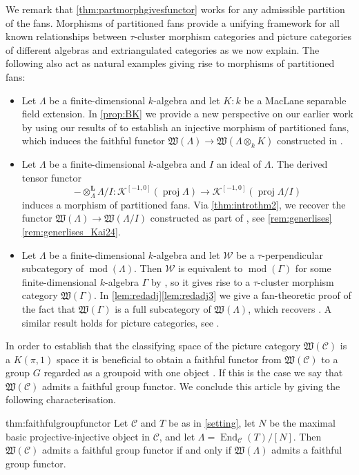 \documentclass[10pt,twoside, a4paper,reqno]{amsart}
\DeclareMathOperator{\mods}{mod}
\DeclareMathOperator{\End}{End}
\DeclareMathOperator{\proj}{proj}
\newcommand{\Ktwo}{\mathcal{K}^{[-1,0]}}
\newcommand{\Wfrak}{\mathfrak{W}}
\newcommand{\calC}{\mathcal{C}}
\newcommand{\calW}{\mathcal{W}}
\theoremstyle{definition}
\begin{document}
We remark that \cref{thm:partmorphgivesfunctor} works for any admissible partition of the fans. Morphisms of partitioned fans provide a unifying framework for all known relationships between $\tau$-cluster morphism categories and picture categories of different algebras and extriangulated categories as we now explain. The following also act as natural examples giving rise to morphisms of partitioned fans:
\begin{itemize}
    \item Let $\Lambda$ be a finite-dimensional $k$-algebra and let $K:k$ be a MacLane separable field extension. In \cref{prop:BK} we provide a new perspective on our earlier work by using our results of \cite{BorveKaipeltautilt} to establish an injective morphism of partitioned fans, which induces the faithful functor $\Wfrak(\Lambda) \to \Wfrak(\Lambda \otimes_k K)$ constructed in \cite[Thm. 0.4]{BorveKaipeltautilt}. 
    \item Let $\Lambda$ be a finite-dimensional $k$-algebra and $I$ an ideal of $\Lambda$. The derived tensor functor 
    \[ - \otimes_\Lambda^{\boldsymbol{L}} \Lambda/I: \Ktwo(\proj \Lambda) \to \Ktwo(\proj \Lambda /I)\]
    induces a morphism of partitioned fans. Via \cref{thm:introthm2}, we recover the functor $\Wfrak(\Lambda) \to \Wfrak({\Lambda}/I)$ constructed as part of \cite[Thm. 1.3]{Kai24}, see \cref{rem:generlises}\eqref{rem:generlises_Kai24}.
    \item Let $\Lambda$ be a finite-dimensional $k$-algebra and let $\calW$ be a $\tau$-perpendicular subcategory of $\mods(\Lambda)$. Then $\calW$ is equivalent to $\mods(\Gamma)$ for some finite-dimensional $k$-algebra $\Gamma$ by \cite[Thm. 1.1]{Jas15}, so it gives rise to a $\tau$-cluster morphism category $\Wfrak(\Gamma)$. In \cref{lem:redadj}\eqref{lem:redadj3} we give a fan-theoretic proof of the fact that $\Wfrak(\Gamma)$ is a full subcategory of $\Wfrak(\Lambda)$, which recovers \cite[Prop. 6.14]{BH21}. A similar result holds for picture categories, see \cite[§6]{Bor24}. 
    \end{itemize}

In order to establish that the classifying space of the picture category $\Wfrak(\calC)$ is a $K(\pi,1)$ space it is beneficial to obtain a faithful functor from  $\Wfrak(\calC)$ to a group $G$ regarded as a groupoid with one object \cite{Igu14}. If this is the case we say that $\Wfrak(\calC)$ admits a faithful group functor. We conclude this article by giving the following characterisation.

\begin{reptheorem}{thm:faithfulgroupfunctor}
    Let $\calC$ and $T$ be as in \cref{setting}, let $N$ be the maximal basic projective-injective object in $\calC$, and let $\Lambda = \End_{\calC}(T)/[N]$. 
    Then $\Wfrak(\calC)$ admits a faithful group functor if and only if $\Wfrak(\Lambda)$ admits a faithful group functor. 
\end{reptheorem}
\end{document}
